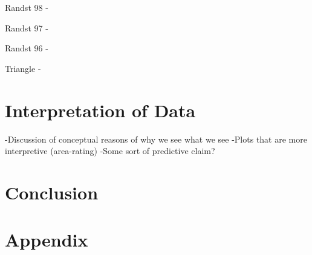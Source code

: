 \documentclass[letterpaper,twocolumn,amsmath,amssymb,pre]{revtex4-1}
\begin{document}
Randst 98 -

Randst 97 -

Randst 96 -

Triangle -


\section{Interpretation of Data}
-Discussion of conceptual reasons of why we see what we see
-Plots that are more interpretive (area-rating)
-Some sort of predictive claim?


\section{Conclusion}


\appendix

\section*{Appendix}
\end{document}
